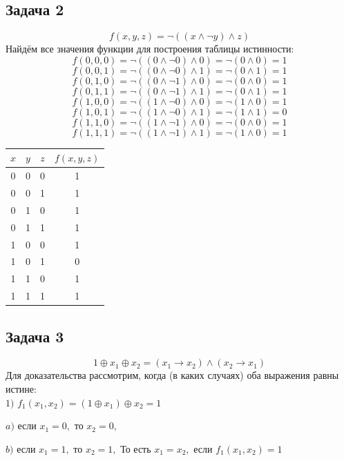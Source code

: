 \documentclass[a4paper,14pt]{article} %
\begin{document}
\begin{center}
\subsection{Задача 2}
\end{center}
\[f(x,y,z)=\neg{((x \wedge \neg y)\wedge z)}\]
Найдём все значения функции для построения таблицы истинности:
\[f(0,0,0)=\neg{((0 \wedge \neg 0)\wedge 0)}=\neg{(0\wedge 0)}=1\]
\[f(0,0,1)=\neg{((0 \wedge \neg 0)\wedge 1)}=\neg{(0\wedge 1)}=1\]
\[f(0,1,0)=\neg{((0 \wedge \neg 1)\wedge 0)}=\neg{(0\wedge 0)}=1\]
\[f(0,1,1)=\neg{((0 \wedge \neg 1)\wedge 1)}=\neg{(0\wedge 1)}=1\]
\[f(1,0,0)=\neg{((1 \wedge \neg 0)\wedge 0)}=\neg{(1\wedge 0)}=1\]
\[f(1,0,1)=\neg{((1 \wedge \neg 0)\wedge 1)}=\neg{(1\wedge 1)}=0\]
\[f(1,1,0)=\neg{((1 \wedge \neg 1)\wedge 0)}=\neg{(0\wedge 0)}=1\]
\[f(1,1,1)=\neg{((1 \wedge \neg 1)\wedge 1)}=\neg{(1\wedge 0)}=1\]
\begin{center}
\begin{tabular}{|c|c|c|c|}
\hline
$x$ & $y$ & $z$ & $f(x,y,z)$ \\
\hline
0 & 0 & 0 & 1 \\
\hline
0 & 0 & 1 & 1 \\
\hline
0 & 1 & 0 & 1 \\
\hline
0 & 1 & 1 & 1 \\
\hline
1 & 0 & 0 & 1 \\
\hline
1 & 0 & 1 & 0 \\
\hline
1 & 1 & 0 & 1 \\
\hline
1 & 1 & 1 & 1 \\
\hline
\end{tabular}
\end{center}

\newpage
\begin{center}
\subsection{Задача 3}
\end{center}
\[1\oplus x_1 \oplus x_2 = (x_1\rightarrow x_2) \wedge (x_2\rightarrow x_1) \]
Для доказательства рассмотрим, когда (в каких случаях) оба выражения равны истине:\\

$1)$ $f_1(x_1, x_2)= (1\oplus x_1) \oplus x_2 =1$

$ a)$ если $x_1=0,$ то $x_2=0,$

$ b)$ если $x_1=1,$ то $x_2=1,$
То есть $x_1 = x_2,$ если $f_1(x_1, x_2)=1$ \\
\end{document}

